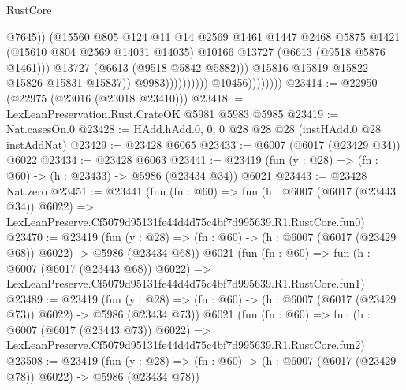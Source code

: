 \begin{lexlean}{RustCore}
\begin{coremodule}
                                                  @7645))
                                              (@15560
                                                @805
                                                @124
                                                @11
                                                @14
                                                @2569
                                                @1461
                                                @1447
                                                @2468
                                                @5875
                                                @1421
                                                (@15610 @804 @2569 @14031 @14035)
                                                @10166
                                                @13727
                                                (@6613 (@9518 @5876 @1461)))
                                              @13727
                                              (@6613 (@9518 @5842 @5882)))
                                            @15816
                                            @15819
                                            @15822
                                            @15826
                                            @15831
                                            @15837))
                                        @9983))))))))))
                    @10456))))))))
@23414 := @22950 (@22975 (@23016 (@23018 @23410)))
@23418 := LexLeanPreservation.Rust.CrateOK @5981 @5983 @5985
@23419 := Nat.casesOn.{0}
@23428 := HAdd.hAdd.{0, 0, 0} @28 @28 @28 (instHAdd.{0} @28 instAddNat)
@23429 := @23428 @6065
@23433 := @6007 (@6017 (@23429 @34)) @6022
@23434 := @23428 @6063
@23441 := @23419 (fun (y : @28) => (fn : @60) -> (h : @23433) -> @5986 (@23434 @34)) @6021
@23443 := @23428 Nat.zero
@23451 := @23441
    (fun (fn : @60) =>
    fun (h : @6007 (@6017 (@23443 @34)) @6022) =>
    LexLeanPreserve.Cf5079d95131fe44d4d75c4bf7d995639.R1.RustCore.fun0)
@23470 := @23419
    (fun (y : @28) => (fn : @60) -> (h : @6007 (@6017 (@23429 @68)) @6022) -> @5986 (@23434 @68))
    @6021
    (fun (fn : @60) =>
    fun (h : @6007 (@6017 (@23443 @68)) @6022) =>
    LexLeanPreserve.Cf5079d95131fe44d4d75c4bf7d995639.R1.RustCore.fun1)
@23489 := @23419
    (fun (y : @28) => (fn : @60) -> (h : @6007 (@6017 (@23429 @73)) @6022) -> @5986 (@23434 @73))
    @6021
    (fun (fn : @60) =>
    fun (h : @6007 (@6017 (@23443 @73)) @6022) =>
    LexLeanPreserve.Cf5079d95131fe44d4d75c4bf7d995639.R1.RustCore.fun2)
@23508 := @23419
    (fun (y : @28) => (fn : @60) -> (h : @6007 (@6017 (@23429 @78)) @6022) -> @5986 (@23434 @78))

\end{coremodule}
\end{lexlean}
